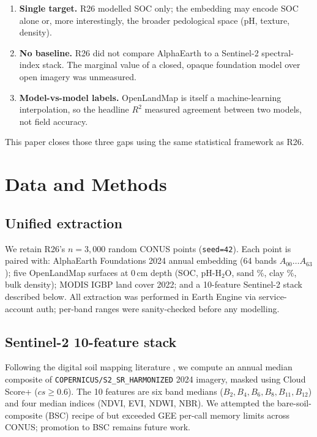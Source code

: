\documentclass[11pt]{article}
\begin{document}
\begin{enumerate}
\item \textbf{Single target.} R26 modelled SOC only; the embedding may
encode SOC alone or, more interestingly, the broader pedological space
(pH, texture, density).
\item \textbf{No baseline.} R26 did not compare AlphaEarth to a
Sentinel-2 spectral-index stack. The marginal value of a closed,
opaque foundation model over open imagery was unmeasured.
\item \textbf{Model-vs-model labels.} OpenLandMap
\cite{hengl2017openlandmap} is itself a machine-learning interpolation,
so the headline $R^2$ measured agreement between two models, not field
accuracy.
\end{enumerate}

This paper closes those three gaps using the same statistical framework
as R26.

\section{Data and Methods}

\subsection{Unified extraction}
We retain R26's $n = 3{,}000$ random CONUS points (\texttt{seed=42}).
Each point is paired with: AlphaEarth Foundations 2024 annual embedding
(64 bands $A_{00}\dots A_{63}$); five OpenLandMap surfaces at 0\,cm
depth (SOC, pH-H$_2$O, sand \%, clay \%, bulk density); MODIS IGBP land
cover \cite{friedl2010modis} 2022; and a 10-feature Sentinel-2 stack
described below. All extraction was performed in Earth Engine
\cite{gorelick2017gee} via service-account auth; per-band ranges were
sanity-checked before any modelling.

\subsection{Sentinel-2 10-feature stack}
Following the digital soil mapping literature \cite{safanelli2020bsc,
loiseau2019density}, we compute an annual median composite of
\texttt{COPERNICUS/S2\_SR\_HARMONIZED} 2024 imagery, masked using
Cloud Score+ ($cs \ge 0.6$). The 10 features are six band medians
($B_2, B_4, B_6, B_8, B_{11}, B_{12}$) and four median indices (NDVI,
EVI, NDWI, NBR). We attempted the bare-soil-composite (BSC) recipe of
\cite{safanelli2020bsc} but exceeded GEE per-call memory limits across
CONUS; promotion to BSC remains future work.
\end{document}
